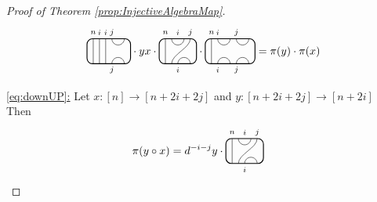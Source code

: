 \documentclass[11pt]{article}
\theoremstyle{plain}
\theoremstyle{definition}
\newcommand{\TLPlusPIso}[3]{
	\TLTStart
	\TLTThrough{#1}
	\TLTSnakeR{#2}{#3}
	\TLTEnd
}
\newcommand{\TLMinusPIso}[3]{
	\TLTStart
	\TLTThrough{#1}
	\TLTSnakeL{#2}{#3}
	\TLTEnd
}
\newcommand{\TLTCalcLabelOffset}[3][0cm]{
	\settowidth{#2}{\scriptsize{$#3$}}
	\setlength{#2}{.5#2}
	\setlength{#2}{\maxof{#2}{#1}}
}
\newcommand{\TLTEnd}{
	\draw[thick, rounded corners = 5pt] (0,0) rectangle ($ (TLTlead) + (0,.8) $);
 \end{tikzpicture}
}
\newcommand{\TLTStart}{
 \begin{tikzpicture}[baseline=.3cm]
	\coordinate (TLTlead) at (.2,0); %
	\let\TLTlabelwidth\relax
	\newlength{\TLTlabelwidth}
}
\newcommand{\TLTThrough}[1]{
	\TLTCalcLabelOffset[.2cm]{\TLTlabelwidth}{#1}
	\coordinate (TLTlead) at ($ (TLTlead) + ({\TLTlabelwidth},0) $);
	\begin{scope}[shift=(TLTlead)]
		\draw (0,0) -- (0,.8);
		\node at (0,1) {\scriptsize{$#1$}};
	\end{scope}
		\coordinate (TLTlead) at ($ (TLTlead) + ({\TLTlabelwidth},0) $);
}
\newcommand{\TLTCapcup}[1]{
	\TLTCalcLabelOffset[.2cm]{\TLTlabelwidth}{#1}
		\coordinate (TLTlead) at ($ (TLTlead) + ({\TLTlabelwidth},0) $);
	\begin{scope}[shift=(TLTlead)]
		\draw (0,0) arc (180:0:.2);
		\draw (0,.8) arc (-180:0:.2);
		\node at (0,1) {\scriptsize{$#1$}};
	\end{scope}
	\TLTCalcLabelOffset[.5cm]{\TLTlabelwidth}{#1}
	\coordinate (TLTlead) at ($ (TLTlead) + ({\TLTlabelwidth},0)$);
}
\newcommand{\TLTSnakeR}[2]{
	\let\TLTscwidth\relax
	\newlength{\TLTscwidth}
	\let\TLTsswidth\relax
	\newlength{\TLTsswidth}
	\TLTCalcLabelOffset[.2cm]{\TLTscwidth}{#1}
	\TLTCalcLabelOffset[.5cm]{\TLTsswidth}{#2}
	\setlength{\TLTlabelwidth}{\TLTscwidth+\TLTsswidth}
	\setlength{\TLTlabelwidth}{\maxof{\TLTlabelwidth}{.7cm}} %
	\coordinate (TLTlead) at ($ (TLTlead) + ({\TLTscwidth},0) $);
	\begin{scope}[shift=(TLTlead)]
		\draw (.1,.8) arc (-180:0:.2cm);
		\draw (.1,0) .. controls ++(90:.3cm) and ++(270:.3cm) .. ($ (.1,.8) + ({\TLTlabelwidth},0) $);
		\draw ($ (.1,0) + ({\TLTsswidth},0) $) arc (180:0:.2cm);
		\node at (.1,1) {\scriptsize{$#1$}};
		\node at ($ (.1,1) + ({\TLTlabelwidth},0) $) {\scriptsize{$#2$}};
		\node at ($ (.1,-.2) + ({\TLTsswidth},0) $) {\scriptsize{$#1$}};
	\end{scope}
	\coordinate (TLTlead) at ($ (TLTlead) + ({\TLTlabelwidth+\TLTsswidth},0) $);
}
\newcommand{\TLTSnakeL}[2]{
	\let\TLTscwidth\relax
	\newlength{\TLTscwidth}
	\let\TLTsswidth\relax
	\newlength{\TLTsswidth}
	\TLTCalcLabelOffset[.2cm]{\TLTscwidth}{#1}
	\TLTCalcLabelOffset[.1cm]{\TLTsswidth}{#2}
	\setlength{\TLTlabelwidth}{\TLTscwidth+\TLTsswidth}
	\setlength{\TLTlabelwidth}{\maxof{\TLTlabelwidth}{.5cm}} %
	\coordinate (TLTlead) at ($ (TLTlead) + ({\TLTsswidth},0) $);
	\begin{scope}[shift=(TLTlead)]
		\draw ($ (.1,.8) + ({\TLTsswidth+\TLTscwidth},0) $) arc (-180:0:.2cm);
		\draw ($ (.1,0) + ({\TLTlabelwidth},0) $) .. controls ++(90:.3cm) and ++(270:.3cm) .. (.1,.8);
		\draw (.1,0) arc (180:0:.2cm);
		\node at ($ (.1,1) + ({\TLTsswidth+\TLTscwidth},0) $) {\scriptsize{$#1$}};
		\node at (.1,1) {\scriptsize{$#2$}};
		\node at (.1,-.2) {\scriptsize{$#1$}};
	\end{scope}
	\setlength{\TLTscwidth}{\maxof{\TLTscwidth}{.5cm}} %
	\coordinate (TLTlead) at ($ (TLTlead) + ({\TLTlabelwidth+\TLTscwidth},0) $);
}
\begin{document}
\begin{proof}[Proof of Theorem \ref{prop:InjectiveAlgebraMap}]
\begin{align*}
	\begin{tikzpicture}[baseline=.3cm]
		\draw (.2,0) -- (.2,.8);
		\node at (.2,1) {\scriptsize{$n$}};
		\draw (.4,0) -- (.4,.8);
		\node at (.4,1) {\scriptsize{$i$}};
		\draw (.6,0) -- (.6,.8);
		\node at (.6,1) {\scriptsize{$i$}};
		\draw (.8,0) arc (180:0:.2cm);
		\node at (.8,-.2) {\scriptsize{$j$}};
		\draw (.8,.8) arc (-180:0:.2cm);
		\node at (.8,1) {\scriptsize{$j$}};
		\draw[thick, rounded corners = 5pt] (0,0) rectangle (1.4,.8);
	\end{tikzpicture}
	\cdot yx \cdot 
	\begin{tikzpicture}[baseline=.3cm]
		\draw (.2,0) -- (.2,.8);
		\node at (.2,1) {\scriptsize{$n$}};
		\draw (.6,0) arc (180:0:.2cm);
		\node at (.6,-.2) {\scriptsize{$i$}};
		\draw (.4,0) .. controls ++(90:.3cm) and ++(270:.3cm) .. (1,.8);
		\node at (1,1) {\scriptsize{$j$}};
		\draw (.4,.8) arc (-180:0:.2cm);
		\node at (.6,1) {\scriptsize{$i$}};
		\draw[thick, rounded corners = 5pt] (0,0) rectangle (1.2,.8);
	\end{tikzpicture}
	\cdot
	\begin{tikzpicture}[baseline=.3cm]
		\draw (.2,0) -- (.2,.8);
		\node at (.2,1) {\scriptsize{$n$}};
		\draw (.4,0) arc (180:0:.2cm);
		\node at (.4,-.2) {\scriptsize{$i$}};
		\draw (.4,.8) arc (-180:0:.2cm);
		\node at (.4,1) {\scriptsize{$i$}};
		\draw (1,0) arc (180:0:.2cm);
		\node at (1,-.2) {\scriptsize{$j$}};
		\draw (1,.8) arc (-180:0:.2cm);
		\node at (1,1) {\scriptsize{$j$}};
		\draw[thick, rounded corners = 5pt] (0,0) rectangle (1.6,.8);
	\end{tikzpicture} %
	= \pi(y) \cdot \pi(x)
\end{align*}
\item[\underline{\ref{eq:downUP}:}]
Let $x:[n]\rightarrow [n+2i+2j]$ and $y:[n+2i+2j]\rightarrow [n+2i]$
Then 
\begin{align*}
	\pi(y\circ x) &= d^{-i-j}y\cdot
	\begin{tikzpicture}[baseline=.3cm]
		\draw (.2,0) -- (.2,.8);
		\node at (.2,1) {\scriptsize{$n$}};
		\draw (.6,0) arc (180:0:.2cm);
		\node at (.6,-.2) {\scriptsize{$i$}};
		\draw (.4,0) .. controls ++(90:.3cm) and ++(270:.3cm) .. (1,.8);
		\node at (1,1) {\scriptsize{$j$}};
		\draw (.4,.8) arc (-180:0:.2cm);
		\node at (.6,1) {\scriptsize{$i$}};
		\draw[thick, rounded corners = 5pt] (0,0) rectangle (1.2,.8);

\end{tikzpicture}
\end{align*}
\end{proof}
\end{document}
